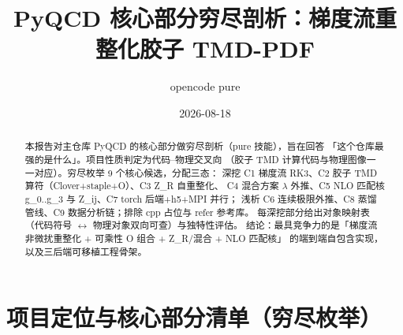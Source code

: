 \documentclass[UTF8]{ctexart}
\title{PyQCD 核心部分穷尽剖析：梯度流重整化胶子 TMD-PDF}
\author{opencode pure}
\date{2026-08-18}
\begin{document}
\maketitle
\sloppy

\begin{abstract}
本报告对主仓库 PyQCD 的\textcolor{struct}{核心部分}做穷尽剖析（pure 技能），旨在回答
「这个仓库最强的是什么」。项目性质判定为\textcolor{idea}{代码--物理交叉向}
（胶子 TMD 计算代码与物理图像一一对应）。穷尽枚举 9 个核心候选，分配三态：
深挖 C1 梯度流 RK3、C2 胶子 TMD 算符（Clover+staple+O）、C3 Z\_R 自重整化、
C4 混合方案 $\lambda$ 外推、C5 NLO 匹配核 g\_0..g\_3 与 Z\_ij、C7 torch 后端+h5+MPI 并行；
浅析 C6 连续极限外推、C8 蒸馏管线、C9 数据分析链；排除 cpp 占位与 refer 参考库。
每深挖部分给出对象映射表（代码符号 $\leftrightarrow$ 物理对象双向可查）与独特性评估。
结论：最具竞争力的是「梯度流非微扰重整化 + 可乘性 O 组合 + Z\_R/混合 + NLO 匹配核」
的端到端自包含实现，以及三后端可移植工程骨架。
\end{abstract}

\tableofcontents

\section{项目定位与核心部分清单（穷尽枚举）}
\end{document}
